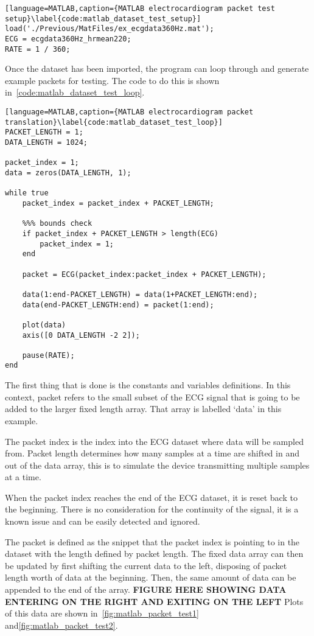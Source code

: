 \begin{lstlisting}[language=MATLAB,caption={MATLAB electrocardiogram packet test setup}\label{code:matlab_dataset_test_setup}]
load('./Previous/MatFiles/ex_ecgdata360Hz.mat');
ECG = ecgdata360Hz_hrmean220;
RATE = 1 / 360;
\end{lstlisting}

Once the dataset has been imported, the program can loop through and generate example packets for testing.
The code to do this is shown in~\autoref{code:matlab_dataset_test_loop}.

\begin{lstlisting}[language=MATLAB,caption={MATLAB electrocardiogram packet translation}\label{code:matlab_dataset_test_loop}]
PACKET_LENGTH = 1;
DATA_LENGTH = 1024;

packet_index = 1;
data = zeros(DATA_LENGTH, 1);

while true
    packet_index = packet_index + PACKET_LENGTH;

    %%% bounds check
    if packet_index + PACKET_LENGTH > length(ECG)
        packet_index = 1;
    end

    packet = ECG(packet_index:packet_index + PACKET_LENGTH);

    data(1:end-PACKET_LENGTH) = data(1+PACKET_LENGTH:end);
    data(end-PACKET_LENGTH:end) = packet(1:end);

    plot(data)
    axis([0 DATA_LENGTH -2 2]);

    pause(RATE);
end
\end{lstlisting}

The first thing that is done is the constants and variables definitions.
In this context, packet refers to the small subset of the ECG signal that is going to be added to the larger fixed length array.
That array is labelled `data' in this example.

The packet index is the index into the ECG dataset where data will be sampled from.
Packet length determines how many samples at a time are shifted in and out of the data array,
this is to simulate the device transmitting multiple samples at a time.

When the packet index reaches the end of the ECG dataset, it is reset back to the beginning.
There is no consideration for the continuity of the signal, it is a known issue and can be easily detected and ignored.

The packet is defined as the snippet that the packet index is pointing to in the dataset with the length defined by packet length.
The fixed data array can then be updated by first shifting the current data to the left, disposing of packet length worth of data at the beginning.
Then, the same amount of data can be appended to the end of the array. \textbf{FIGURE HERE SHOWING DATA ENTERING ON THE RIGHT AND EXITING ON THE LEFT}
Plots of this data are shown in~\autoref{fig:matlab_packet_test1} and\autoref{fig:matlab_packet_test2}.

